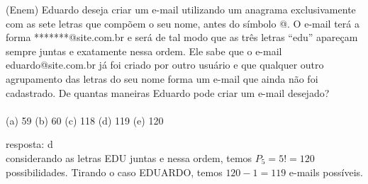 \begin{ex}
 (Enem) Eduardo deseja criar um e-mail utilizando um anagrama exclusivamente com as sete letras que compõem o seu nome, antes do símbolo @. O e-mail terá a forma *******@site.com.br e será de tal modo que as três letras “edu” apareçam sempre juntas e exatamente nessa ordem. Ele sabe que o e-mail eduardo@site.com.br já foi criado por outro usuário e que qualquer outro agrupamento das letras do seu nome forma um e-mail que ainda não foi cadastrado. De quantas maneiras Eduardo pode criar um e-mail desejado? \\ \\
 (a) 59\hspace{0,7cm}  (b) 60\hspace{0,7cm}   (c) 118\hspace{0,7cm}   (d) 119\hspace{0,7cm}   (e) 120
      \begin{sol}
       resposta: d \\
     considerando as letras EDU juntas e nessa ordem, temos $P_5=5!=120$ possibilidades. Tirando o caso EDUARDO, temos $120-1=119$ e-mails possíveis.
      \end{sol}
 \end{ex}